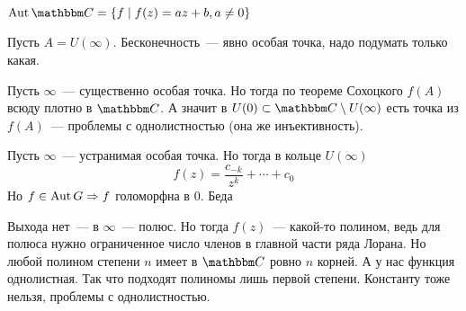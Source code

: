 \documentclass[12pt,timbord]{../../../notes}
\begin{document}
\begin{thrm}\label{thrm:tfcv::classaut::C}
  $\displaystyle \Aut \C  = \{f \mid f(z) = {az+b}, a\neq 0\}$
\end{thrm}
\begin{ittproof}
  Пусть $A = U(\infty)$. Бесконечность~--- явно особая точка, надо подумать только какая.
  
  Пусть $\infty$~--- существенно особая точка. Но тогда по теореме Сохоцкого $f(A)$ всюду плотно в
  $\C$. А значит в $U(0) \subset \C\setminus U(\infty)$ есть точка из $f(A)$~--- проблемы с
  однолистностью (она же инъективность).

  Пусть $\infty$~--- устранимая особая точка. Но тогда в кольце $U(\infty)$
  \[
    f(z) = \frac{c_{-k}}{z^k} + \dotsb + c_0
  \]
  Но $f\in  \operatorname{Aut} G \Rightarrow f$ голоморфна в $0$. Беда

  Выхода нет~--- в $\infty$~--- полюс. Но тогда $f(z)$~--- какой-то полином, ведь для полюса нужно
  ограниченное число  членов в главной части ряда Лорана. Но любой полином степени $n
  $ имеет в $\C$ ровно $n$ корней. А у нас функция однолистная. Так что подходят полиномы лишь
  первой степени. Константу тоже нельзя, проблемы с однолистностью. 
\end{ittproof}
\end{document}
